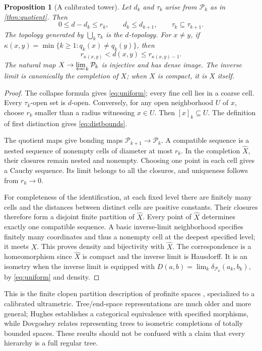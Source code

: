 \documentclass[11pt]{article}
\newtheorem{proposition}[theorem]{Proposition}
\theoremstyle{definition}
\theoremstyle{remark}
\newcommand{\PP}{\mathcal P}
\begin{document}
\begin{proposition}[A calibrated tower]\label{prop:tower}
Let $d_k$ and $\tau_k$ arise from $\PP_k$ as in \cref{thm:quotient}. Then
\begin{equation}\label{eq:uniform}
 0\leq d-d_k\leq r_k,\qquad d_k\leq d_{k+1},
 \qquad \tau_k\subseteq\tau_{k+1}.
\end{equation}
The topology generated by $\bigcup_k\tau_k$ is the $d$-topology. For $x\ne y$, if
$\kappa(x,y)=\min\{k\geq1:q_k(x)\ne q_k(y)\}$, then
\begin{equation}\label{eq:distbounds}
 r_{\kappa(x,y)}<d(x,y)\leq r_{\kappa(x,y)-1}.
\end{equation}
The natural map $X\to\varprojlim_k\PP_k$ is injective and has dense image. The inverse limit is canonically the completion of $X$; when $X$ is compact, it is $X$ itself.
\end{proposition}
\begin{proof}
The collapse formula gives \eqref{eq:uniform}; every fine cell lies in a coarse cell. Every $\tau_k$-open set is $d$-open. Conversely, for any open neighborhood $U$ of $x$, choose $r_k$ smaller than a radius witnessing $x\in U$. Then $[x]_k\subseteq U$. The definition of first distinction gives \eqref{eq:distbounds}.

The quotient maps give bonding maps $\PP_{k+1}\to\PP_k$. A compatible sequence is a nested sequence of nonempty cells of diameter at most $r_k$. In the completion $\widehat X$, their closures remain nested and nonempty. Choosing one point in each cell gives a Cauchy sequence. Its limit belongs to all the closures, and uniqueness follows from $r_k\to0$.

For completeness of the identification, at each fixed level there are finitely many cells and the distances between distinct cells are positive constants. Their closures therefore form a disjoint finite partition of $\widehat X$. Every point of $\widehat X$ determines exactly one compatible sequence. A basic inverse-limit neighborhood specifies finitely many coordinates and thus a nonempty cell at the deepest specified level; it meets $X$. This proves density and bijectivity with $\widehat X$. The correspondence is a homeomorphism since $\widehat X$ is compact and the inverse limit is Hausdorff. It is an isometry when the inverse limit is equipped with
$D(a,b)=\lim_k\delta_{\PP_k}(a_k,b_k)$, by \eqref{eq:uniform} and density.
\end{proof}

This is the finite clopen partition description of profinite spaces \cite[Lemma 5.22.2]{Stacks}, specialized to a calibrated ultrametric. Tree/end-space representations are much older and more general; Hughes \cite{Hughes2004} establishes a categorical equivalence with specified morphisms, while Dovgoshey \cite[Theorem 10.25]{Dovgoshey2025} relates representing trees to isometric completions of totally bounded spaces. These results should not be confused with a claim that every hierarchy is a full regular tree.
\end{document}
